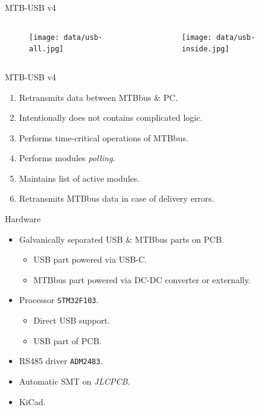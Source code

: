 \documentclass[aspectratio=169]{beamer}
\begin{document}
\begin{frame}{MTB-USB v4}
\begin{columns}
	\begin{column}{.4\textwidth}
		\begin{figure}
		\texttt{[image: data/usb-all.jpg]}
		\end{figure}
	\end{column}
	\begin{column}{.6\textwidth}
		\begin{figure}
		\texttt{[image: data/usb-inside.jpg]}
		\end{figure}
	\end{column}
\end{columns}
\end{frame}


\begin{frame}{MTB-USB v4}
\begin{enumerate}
\item Retransmits data between MTBbus \& PC.
\item Intentionally does not contains complicated logic.
\item Performs time-critical operations of MTBbus.
\item Performs modules \textit{polling}.
\item Maintains list of active modules.
\item Retransmits MTBbus data in case of delivery errors.
\end{enumerate}
\end{frame}


\begin{frame}{Hardware}
\begin{itemize}
\item Galvanically separated USB \& MTBbus parts on PCB.
\begin{itemize}
\item USB part powered via USB-C.
\item MTBbus part powered via DC-DC converter or externally.
\end{itemize}
\item Processor \texttt{STM32F103}.
\begin{itemize}
\item Direct USB support.
\item USB part of PCB.
\end{itemize}
\item RS485 driver \texttt{ADM2483}.
\item Automatic SMT on \textit{JLCPCB}.
\item KiCad.
\end{itemize}
\end{frame}
\end{document}
